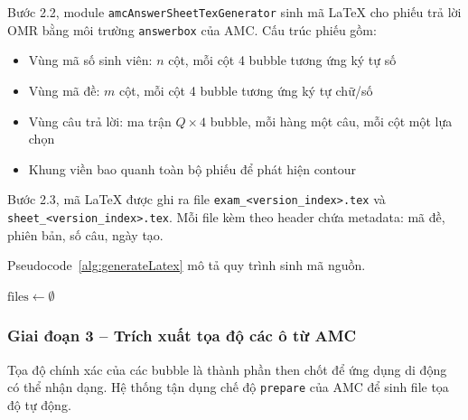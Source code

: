 ﻿\documentclass[../DoAn.tex]{subfiles}
\begin{document}
Bước 2.2, module \texttt{amcAnswerSheetTexGenerator} sinh mã LaTeX cho phiếu trả lời OMR bằng môi trường \texttt{answerbox} của AMC. Cấu trúc phiếu gồm:
\begin{itemize}
  \item Vùng mã số sinh viên: $n$ cột, mỗi cột 4 bubble tương ứng ký tự số
  \item Vùng mã đề: $m$ cột, mỗi cột 4 bubble tương ứng ký tự chữ/số
  \item Vùng câu trả lời: ma trận $Q \times 4$ bubble, mỗi hàng một câu, mỗi cột một lựa chọn
  \item Khung viền bao quanh toàn bộ phiếu để phát hiện contour
\end{itemize}

Bước 2.3, mã LaTeX được ghi ra file \texttt{exam\_\textless version\_index\textgreater.tex} và \texttt{sheet\_\textless version\_index\textgreater.tex}. Mỗi file kèm theo header chứa metadata: mã đề, phiên bản, số câu, ngày tạo.

Pseudocode~\ref{alg:generateLatex} mô tả quy trình sinh mã nguồn.

\begin{algorithm}[H]
\caption{Sinh mã nguồn LaTeX}
\label{alg:generateLatex}
\SetAlgoLined
{}
 $\text{files} \gets \emptyset$ \;
  \;
\end{algorithm}

\subsubsection{Giai đoạn 3 -- Trích xuất tọa độ các ô từ AMC}
Tọa độ chính xác của các bubble là thành phần then chốt để ứng dụng di động có thể nhận dạng. Hệ thống tận dụng chế độ \texttt{prepare} của AMC để sinh file tọa độ tự động.
\end{document}
